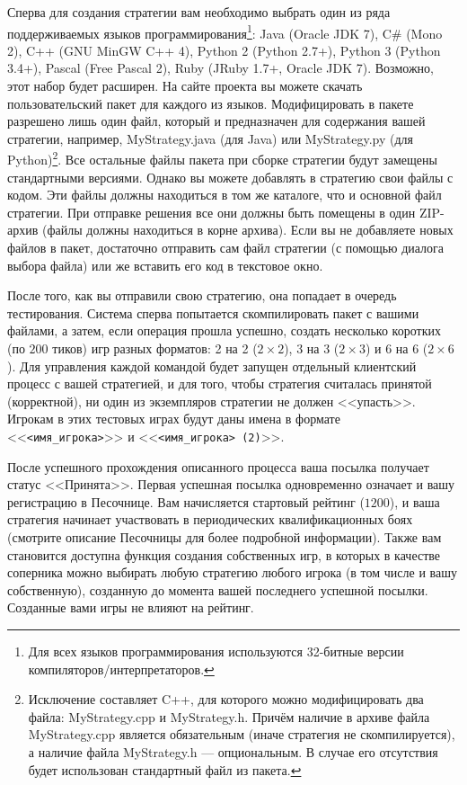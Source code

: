 Сперва для создания стратегии вам необходимо выбрать один из ряда поддерживаемых языков программирования\footnote[6]{Для всех языков
программирования используются 32-битные версии компиляторов/интерпретаторов.}: Java (Oracle JDK 7), C\# (Mono 2), C++ (GNU MinGW C++ 4),
Python 2 (Python 2.7+), Python 3 (Python 3.4+), Pascal (Free Pascal 2), Ruby (JRuby 1.7+, Oracle JDK 7). Возможно, этот набор будет
расширен. На сайте проекта вы можете скачать пользовательский пакет для каждого из языков. Модифицировать в пакете разрешено лишь один файл,
который и предназначен для содержания вашей стратегии, например, MyStrategy.java (для Java) или MyStrategy.py (для
Python)\footnote[7]{Исключение составляет C++, для которого можно модифицировать два файла: MyStrategy.cpp и MyStrategy.h. Причём наличие в
архиве файла MyStrategy.cpp является обязательным (иначе стратегия не скомпилируется), а наличие файла MyStrategy.h --- опциональным. В
случае его отсутствия будет использован стандартный файл из пакета.}. Все остальные файлы пакета при сборке стратегии будут замещены
стандартными версиями. Однако вы можете добавлять в стратегию свои файлы с кодом. Эти файлы должны находиться в том же каталоге, что и
основной файл стратегии. При отправке решения все они должны быть помещены в один ZIP-архив (файлы должны находиться в корне архива). Если
вы не добавляете новых файлов в пакет, достаточно отправить сам файл стратегии (с помощью диалога выбора файла) или же вставить его код в
текстовое окно.

После того, как вы отправили свою стратегию, она попадает в очередь тестирования. Система сперва попытается скомпилировать пакет с вашими
файлами, а затем, если операция прошла успешно, создать несколько коротких (по $200$ тиков) игр разных форматов: 2 на 2 ($2\times2$), 3 на 3
($2\times3$) и 6 на 6 ($2\times6$). Для управления каждой командой будет запущен отдельный клиентский процесс с вашей стратегией, и для
того, чтобы стратегия считалась принятой (корректной), ни один из экземпляров стратегии не должен <<упасть>>. Игрокам в этих тестовых играх
будут даны имена в формате <<\texttt{<имя\_игрока>}>> и <<\texttt{<имя\_игрока> (2)}>>.

После успешного прохождения описанного процесса ваша посылка получает статус <<Принята>>. Первая успешная посылка одновременно означает и
вашу регистрацию в Песочнице. Вам начисляется стартовый рейтинг ($1200$), и ваша стратегия начинает участвовать в периодических
квалификационных боях (смотрите описание Песочницы для более подробной информации). Также вам становится доступна функция создания
собственных игр, в которых в качестве соперника можно выбирать любую стратегию любого игрока (в том числе и вашу собственную), созданную до
момента вашей последнего успешной посылки. Созданные вами игры не влияют на рейтинг.

